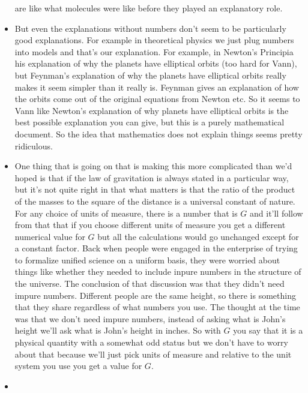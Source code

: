 \documentclass[12pt]{article}
\theoremstyle{definition}
\begin{document}
\begin{itemize}
        are like what molecules were like before they played an explanatory
        role.
    \item
        But even the explanations without numbers don't seem to be particularly
        good explanations. For example in theoretical physics we just plug
        numbers into models and that's our explanation. For example, in
        Newton's Principia his explanation of why the planets have elliptical
        orbits (too hard for Vann), but Feynman's explanation of why the
        planets have elliptical orbits really makes it seem simpler than it
        really is. Feynman gives an explanation of how the orbits come out of
        the original equations from Newton etc. So it seems to Vann like
        Newton's explanation of why planets have elliptical orbits is the best
        possible explanation you can give, but this is a purely mathematical
        document. So the idea that mathematics does not explain things seems
        pretty ridiculous.
    \item
        One thing that is going on that is making this more complicated than
        we'd hoped is that if the law of gravitation is always stated in a
        particular way, but it's not quite right in that what matters is that
        the ratio of the product of the masses to the square of the distance is
        a universal constant of nature. For any choice of units of measure,
        there is a number that is $G$ and it'll follow from that that if you
        choose different units of measure you get a different numerical value
        for $G$ but all the calculations would go unchanged except for a
        constant factor. Back when people were engaged in the enterprise of
        trying to formalize unified science on a uniform basis, they were
        worried about things like whether they needed to include inpure numbers
        in the structure of the universe. The conclusion of that discussion was
        that they didn't need impure numbers. Different people are the same
        height, so there is something that they share regardless of what
        numbers you use. The thought at the time was that we don't need impure
        numbers, instead of asking what is John's height we'll ask what is
        John's height in inches. So with $G$ you say that it is a physical
        quantity with a somewhat odd status but we don't have to worry about
        that because we'll just pick units of measure and relative to the unit
        system you use you get a value for $G$.
    \item

\end{itemize}
\end{document}
